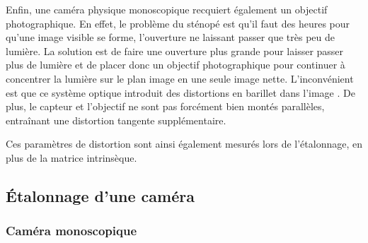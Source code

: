 Enfin, une caméra physique monoscopique recquiert également un objectif photographique. En effet, le problème du sténopé est qu'il faut des heures pour qu'une image visible se forme, l'ouverture ne laissant passer que très peu de lumière. La solution est de faire une ouverture plus grande pour laisser passer plus de lumière et de placer donc un objectif photographique pour continuer à concentrer la lumière sur le plan image en une seule image nette. L'inconvénient est que ce système optique introduit des distortions en barillet dans l'image . De plus, le capteur et l'objectif ne sont pas forcément bien montés parallèles, entraînant une distortion tangente supplémentaire.

Ces paramètres de distortion sont ainsi également mesurés lors de l'étalonnage, en plus de la matrice intrinsèque.


\subsection{Étalonnage d'une caméra}
\subsubsection{Caméra monoscopique}




